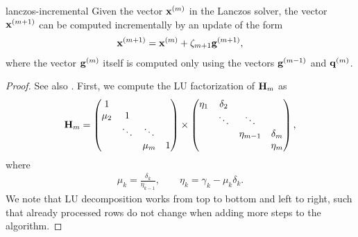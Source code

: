\begin{Lemma}{lanczos-incremental}
  Given the vector $\mathbf x^{(m)}$ in the Lanczos solver, the vector
  $\mathbf x^{(m+1)}$ can be computed incrementally by an update of the form
  \begin{gather}
    \mathbf x^{(m+1)} = \mathbf x^{(m)} + \zeta_{m+1}\mathbf g^{(m+1)},
  \end{gather}
  where the vector $\mathbf g^{(m)}$ itself is computed only using the
  vectors $\mathbf g^{(m-1)}$ and $\mathbf q^{(m)}$.
\end{Lemma}

\begin{proof}
  See also \cite[Section 6.7.1]{Saad00}. First, we compute the LU factorization of $\mathbf H_m$ as
  \begin{gather}
    \mathbf H_m =
    \begin{pmatrix}
      1\\\mu_2&1\\
      &\ddots&\ddots\\
      &&\mu_m&1
    \end{pmatrix}
    \times
    \begin{pmatrix}
      \eta_1&\delta_2\\
      &\ddots&\ddots\\
      &&\eta_{m-1}&\delta_m\\
      &&&\eta_m
    \end{pmatrix},
  \end{gather}
  where
  \begin{gather}
    \mu_k = \frac{\delta_k}{\eta_{k-1}},
    \qquad
    \eta_k = \gamma_k - \mu_k \delta_k.
  \end{gather}
  We note that LU decomposition works from top to bottom and left to
  right, such that already processed rows do not change when adding
  more steps to the algorithm.


\end{proof}
